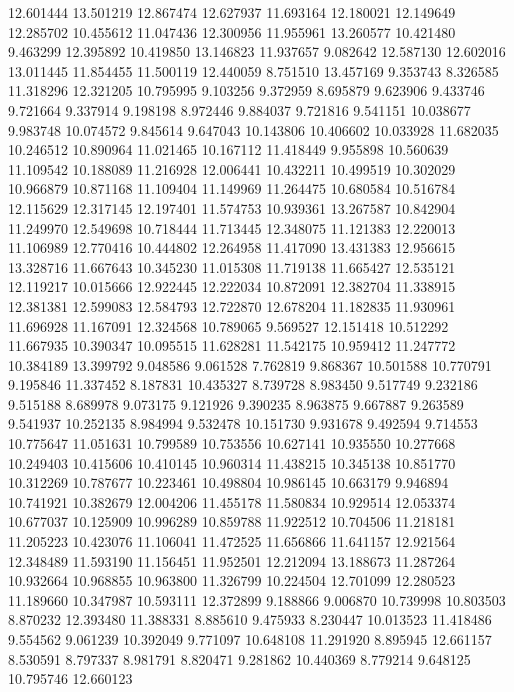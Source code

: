 12.601444
13.501219
12.867474
12.627937
11.693164
12.180021
12.149649
12.285702
10.455612
11.047436
12.300956
11.955961
13.260577
10.421480
9.463299
12.395892
10.419850
13.146823
11.937657
9.082642
12.587130
12.602016
13.011445
11.854455
11.500119
12.440059
8.751510
13.457169
9.353743
8.326585
11.318296
12.321205
10.795995
9.103256
9.372959
8.695879
9.623906
9.433746
9.721664
9.337914
9.198198
8.972446
9.884037
9.721816
9.541151
10.038677
9.983748
10.074572
9.845614
9.647043
10.143806
10.406602
10.033928
11.682035
10.246512
10.890964
11.021465
10.167112
11.418449
9.955898
10.560639
11.109542
10.188089
11.216928
12.006441
10.432211
10.499519
10.302029
10.966879
10.871168
11.109404
11.149969
11.264475
10.680584
10.516784
12.115629
12.317145
12.197401
11.574753
10.939361
13.267587
10.842904
11.249970
12.549698
10.718444
11.713445
12.348075
11.121383
12.220013
11.106989
12.770416
10.444802
12.264958
11.417090
13.431383
12.956615
13.328716
11.667643
10.345230
11.015308
11.719138
11.665427
12.535121
12.119217
10.015666
12.922445
12.222034
10.872091
12.382704
11.338915
12.381381
12.599083
12.584793
12.722870
12.678204
11.182835
11.930961
11.696928
11.167091
12.324568
10.789065
9.569527
12.151418
10.512292
11.667935
10.390347
10.095515
11.628281
11.542175
10.959412
11.247772
10.384189
13.399792
9.048586
9.061528
7.762819
9.868367
10.501588
10.770791
9.195846
11.337452
8.187831
10.435327
8.739728
8.983450
9.517749
9.232186
9.515188
8.689978
9.073175
9.121926
9.390235
8.963875
9.667887
9.263589
9.541937
10.252135
8.984994
9.532478
10.151730
9.931678
9.492594
9.714553
10.775647
11.051631
10.799589
10.753556
10.627141
10.935550
10.277668
10.249403
10.415606
10.410145
10.960314
11.438215
10.345138
10.851770
10.312269
10.787677
10.223461
10.498804
10.986145
10.663179
9.946894
10.741921
10.382679
12.004206
11.455178
11.580834
10.929514
12.053374
10.677037
10.125909
10.996289
10.859788
11.922512
10.704506
11.218181
11.205223
10.423076
11.106041
11.472525
11.656866
11.641157
12.921564
12.348489
11.593190
11.156451
11.952501
12.212094
13.188673
11.287264
10.932664
10.968855
10.963800
11.326799
10.224504
12.701099
12.280523
11.189660
10.347987
10.593111
12.372899
9.188866
9.006870
10.739998
10.803503
8.870232
12.393480
11.388331
8.885610
9.475933
8.230447
10.013523
11.418486
9.554562
9.061239
10.392049
9.771097
10.648108
11.291920
8.895945
12.661157
8.530591
8.797337
8.981791
8.820471
9.281862
10.440369
8.779214
9.648125
10.795746
12.660123
